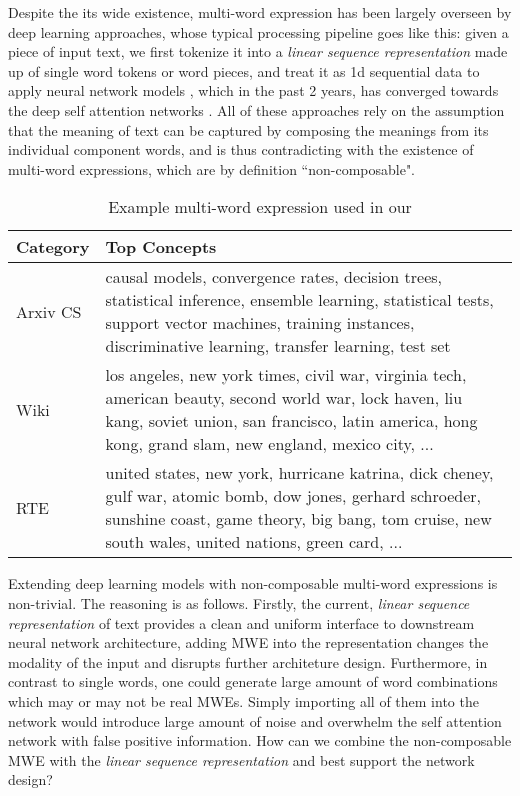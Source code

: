 
Despite the its wide existence,  multi-word expression has been largely overseen by deep learning approaches, 
whose typical processing pipeline goes like this:
given a piece of input text, 
we first tokenize it into a \textit{linear sequence representation} made up of single word tokens or word pieces,
and treat it as 1d sequential data to apply neural network models \cite{collobert2011natural, zhou2016attention, devlin2018bert}, which in the past 2 years, has converged towards the deep self attention networks \cite{vaswani2017attention}. 
All of these approaches rely on the assumption that the meaning of text can be captured by composing the meanings from its individual component words, 
and is thus contradicting with the existence of multi-word expressions, which are by definition ``non-composable".


\begin{table}
\centering
\caption{Example multi-word expression used in our }\label{tab:dataset-stats}

\begin{tabular}{ll}
\toprule
\textbf{Category}  & \textbf{Top Concepts} \\
\midrule
Arxiv CS & \multicolumn{1}{p{.35\textwidth}}{\raggedright causal models, convergence rates, decision trees, statistical inference, ensemble learning, statistical tests, support vector machines, training instances, discriminative learning, transfer learning, test set
} \\
\midrule
Wiki & \multicolumn{1}{p{.35\textwidth}}{\raggedright los angeles, new york times, civil war, virginia tech, american beauty, second world war, lock haven, liu kang, soviet union, san francisco, latin america, hong kong, grand slam, new england, mexico city, ...
}  \\
\bottomrule
RTE & \multicolumn{1}{p{.35\textwidth}}{\raggedright united states, new york, hurricane katrina, dick cheney, gulf war, atomic bomb, dow jones, gerhard schroeder, sunshine coast, game theory, big bang, tom cruise, new south wales, united nations, green card, ...
}  \\
\bottomrule
\end{tabular}
\label{tab-examplar}
\end{table}

Extending deep learning models with non-composable multi-word expressions is non-trivial. 
The reasoning is as follows. 
Firstly, the current, \textit{linear sequence representation} of text provides a clean and uniform interface to downstream neural network architecture, 
adding MWE into the representation changes the modality of the input and disrupts further architeture design. 
Furthermore, in contrast to single words,  one could generate large amount of word combinations which may or may not be real MWEs. 
Simply importing all of them into the network would introduce large amount of noise and overwhelm the self attention network with false positive information. 
How can we combine the non-composable MWE with the \textit{linear sequence representation} and best support the network design?


